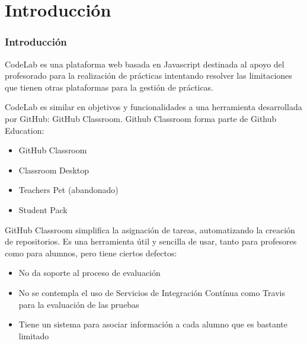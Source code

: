 \documentclass{beamer}
\begin{document}
\section{Introducción}
\begin{frame}
  \frametitle{Introducción}
  
  \begin{center}
    CodeLab es una plataforma web basada en Javascript destinada al apoyo del profesorado para la realización de prácticas 
    intentando resolver las limitaciones que tienen otras plataformas para la gestión de prácticas.  

  \end{center}

  \framebreak
  
    CodeLab es similar en objetivos y funcionalidades a una herramienta desarrollada por GitHub: GitHub Classroom.  Github Classroom forma parte de Github Education:
  
  \begin{itemize}
    \item GitHub Classroom
    \item Classroom Desktop
    \item Teachers Pet (abandonado)
    \item Student Pack
  \end{itemize}

  \framebreak
    GitHub Classroom simplifica la asignación de tareas, automatizando la creación de repositorios.
    Es una herramienta útil y sencilla de usar, tanto para profesores como para alumnos, 
    pero tiene ciertos defectos:

    \begin{itemize}
      \item No da soporte al proceso de evaluación 
      \item No se contempla el uso de Servicios de Integración Contínua como Travis para la evaluación de las pruebas
      \item Tiene un sistema para asociar información a cada alumno que es bastante limitado
    \end{itemize}
  \framebreak
  

\end{frame}
\end{document}
